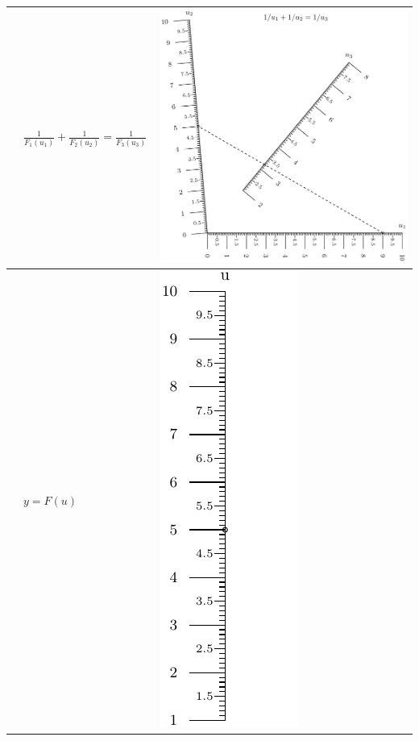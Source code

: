 \documentclass[a4paper,11pt,english]{sphinxmanual}
\begin{document}
\begin{tabulary}{\linewidth}{|L|L|L|}
\\
\hline
{\hyperref[types/types:type7-ref]{\emph{}}}
 & 
\(\frac{1}{F_1(u_1)}+\frac{1}{F_2(u_2)}=\frac{1}{F_3(u_3)} \,\)
 & 
\includegraphics{ex_type7_nomo_1.pdf}
\\
\hline
{\hyperref[types/types:type8-ref]{\emph{}}}
 & 
\(y = {F(u)} \,\)
 & 
\includegraphics{ex_type8_nomo_1.pdf}

\end{tabulary}
\end{document}
